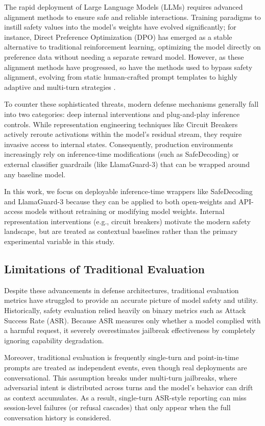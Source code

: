 \documentclass[10pt, twocolumn]{article}
\begin{document}
The rapid deployment of Large Language Models (LLMs) requires advanced alignment methods to ensure safe and reliable interactions. Training paradigms to instill safety values into the model's weights have evolved significantly; for instance, Direct Preference Optimization (DPO) has emerged as a stable alternative to traditional reinforcement learning, optimizing the model directly on preference data without needing a separate reward model. However, as these alignment methods have progressed, so have the methods used to bypass safety alignment, evolving from static human-crafted prompt templates to highly adaptive and multi-turn strategies \cite{wei2023jailbroken}.

To counter these sophisticated threats, modern defense mechanisms generally fall into two categories: deep internal interventions and plug-and-play inference controls. While representation engineering techniques like Circuit Breakers actively reroute activations within the model's residual stream, they require invasive access to internal states. Consequently, production environments increasingly rely on inference-time modifications (such as SafeDecoding) or external classifier guardrails (like LlamaGuard-3) that can be wrapped around any baseline model.

In this work, we focus on deployable inference-time wrappers like SafeDecoding and LlamaGuard-3 because they can be applied to both open-weights and API-access models without retraining or modifying model weights. Internal representation interventions (e.g., circuit breakers) motivate the modern safety landscape, but are treated as contextual baselines rather than the primary experimental variable in this study.

\subsection{Limitations of Traditional Evaluation}
\label{sec:limitations}

Despite these advancements in defense architectures, traditional evaluation metrics have struggled to provide an accurate picture of model safety and utility. Historically, safety evaluation relied heavily on binary metrics such as Attack Success Rate (ASR). Because ASR measures only whether a model complied with a harmful request, it severely overestimates jailbreak effectiveness by completely ignoring capability degradation.

Moreover, traditional evaluation is frequently single-turn and point-in-time prompts are treated as independent events, even though real deployments are conversational. This assumption breaks under multi-turn jailbreaks, where adversarial intent is distributed across turns and the model's behavior can drift as context accumulates. As a result, single-turn ASR-style reporting can miss session-level failures (or refusal cascades) that only appear when the full conversation history is considered.
\end{document}

